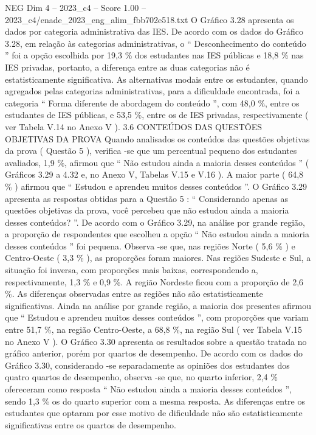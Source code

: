 \begin{textsample}{NEG Dim 4 – 2023\_c4 – Score 1.00 – 2023\_c4/enade\_2023\_eng\_alim\_fbb702e518.txt}
O Gráfico 3.28 apresenta os dados por categoria administrativa das IES.
De acordo com os dados do Gráfico 3.28, em relação às categorias administrativas, o “ Desconhecimento do conteúdo ” foi a opção escolhida por 19,3 \% dos estudantes nas IES públicas e 18,8 \% nas IES privadas, portanto, a diferença entre as duas categorias não é estatisticamente significativa.
As alternativas modais entre os estudantes, quando agregados pelas categorias administrativas, para a dificuldade encontrada, foi a categoria “ Forma diferente de abordagem do conteúdo ”, com 48,0 \%, entre os estudantes de IES públicas, e 53,5 \%, entre os de IES privadas, respectivamente ( ver Tabela V.14 no Anexo V ). 3.6 CONTEÚDOS DAS QUESTÕES OBJETIVAS DA PROVA Quando analisados os conteúdos das questões objetivas da prova ( Questão 5 ), verifica -se que um percentual pequeno dos estudantes avaliados, 1,9 \%, afirmou que “ Não estudou ainda a maioria desses conteúdos ” ( Gráficos 3.29 a 4.32 e, no Anexo V, Tabelas V.15 e V.16 ).
A maior parte ( 64,8 \% ) afirmou que “ Estudou e aprendeu muitos desses conteúdos ”.
O Gráfico 3.29 apresenta as respostas obtidas para a Questão 5 : “ Considerando apenas as questões objetivas da prova, você percebeu que não estudou ainda a maioria desses conteúdos? ”.
De acordo com o Gráfico 3.29, na análise por grande região, a proporção de respondentes que escolheu a opção “ Não estudou ainda a maioria desses conteúdos ” foi pequena.
Observa -se que, nas regiões Norte ( 5,6 \% ) e Centro-Oeste ( 3,3 \% ), as proporções foram maiores.
Nas regiões Sudeste e Sul, a situação foi inversa, com proporções mais baixas, correspondendo a, respectivamente, 1,3 \% e 0,9 \%.
A região Nordeste ficou com a proporção de 2,6 \%.
As diferenças observadas entre as regiões não são estatisticamente significativas.
Ainda na análise por grande região, a maioria dos presentes afirmou que “ Estudou e aprendeu muitos desses conteúdos ”, com proporções que variam entre 51,7 \%, na região Centro-Oeste, a 68,8 \%, na região Sul ( ver Tabela V.15 no Anexo V ).
O Gráfico 3.30 apresenta os resultados sobre a questão tratada no gráfico anterior, porém por quartos de desempenho.
De acordo com os dados do Gráfico 3.30, considerando -se separadamente as opiniões dos estudantes dos quatro quartos de desempenho, observa -se que, no quarto inferior, 2,4 \% ofereceram como resposta “ Não estudou ainda a maioria desses conteúdos ”, sendo 1,3 \% os do quarto superior com a mesma resposta.
As diferenças entre os estudantes que optaram por esse motivo de dificuldade não são estatisticamente significativas entre os quartos de desempenho.

\end{textsample}
